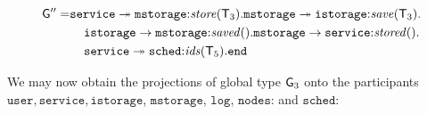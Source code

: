 \begin{align*}
{\sf G}'' = & 
\mathtt{service} \twoheadrightarrow \mathtt{mstorage}{:}\mathit{store}({\mathsf T}_3).
\mathtt{mstorage} \twoheadrightarrow \mathtt{istorage}{:}\mathit{save}({\mathsf T}_3).\\
& \hspace{4mm}
\mathtt{istorage} \to \mathtt{mstorage}{:}\mathit{saved}().
\mathtt{mstorage} \to \mathtt{service}{:}\mathit{stored}().\\
& \hspace{4mm}
\mathtt{service} \twoheadrightarrow \mathtt{sched}{:}\mathit{ids}({\mathsf T}_5).\mathtt{end}
\end{align*}

\noindent
We may now obtain the projections of global type ${\sf G}_3$ onto the participants $\mathtt{user}, \mathtt{service}, \mathtt{istorage}$, $\mathtt{mstorage}$, $\mathtt{log}$, $\mathtt{nodes}$: and $\mathtt{sched}$:

